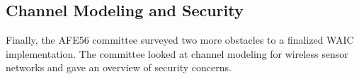 


 
 
\subsection{Channel Modeling and Security}
Finally, the AFE56 committee surveyed two more obstacles to a finalized WAIC implementation. The committee looked at channel modeling for wireless sensor networks and  gave an overview of security concerns. 

